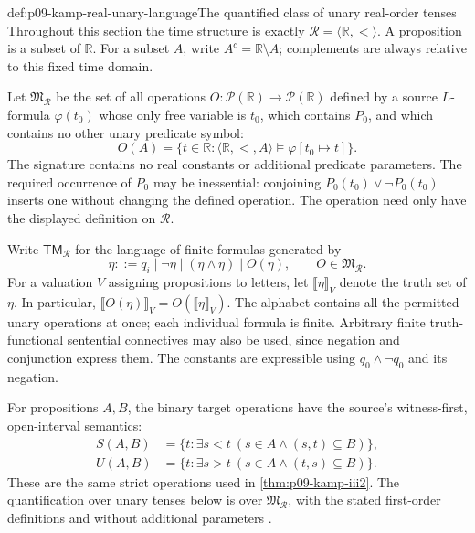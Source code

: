 \begin{hbdefinition}{def:p09-kamp-real-unary-language}{The quantified class of unary real-order tenses}
Throughout this section the time structure is exactly
\(\mathcal R=\langle\mathbb R,<\rangle\). A proposition is a subset
of \(\mathbb R\). For a subset \(A\), write
\(A^c=\mathbb R\setminus A\); complements are always relative to
this fixed time domain.

Let \(\mathfrak M_{\mathcal R}\) be the set of all operations
\(O:\mathcal P(\mathbb R)\to\mathcal P(\mathbb R)\) defined by
a source \(L\)-formula \(\varphi(t_0)\) whose only free variable
is \(t_0\), which contains \(P_0\), and which contains no
other unary predicate symbol:
\[
 O(A)=\{t\in\mathbb R:
       \langle\mathbb R,<,A\rangle\models\varphi[t_0\mapsto t]\}.
\]
The signature contains no real constants or additional predicate
parameters. The required occurrence of \(P_0\) may be
inessential: conjoining \(P_0(t_0)\lor\neg P_0(t_0)\)
inserts one without changing the defined operation. The operation
need only have the displayed definition on \(\mathcal R\).

Write \(\mathsf{TM}_{\mathcal R}\) for the language of finite
formulas generated by
\[
 \eta ::= q_i\mid\neg\eta\mid(\eta\land\eta)
                 \mid O(\eta),\qquad O\in\mathfrak M_{\mathcal R}.
\]
For a valuation \(V\) assigning propositions to letters, let
\(\llbracket\eta\rrbracket_V\) denote the truth set of \(\eta\).
In particular,
\(\llbracket O(\eta)\rrbracket_V
 =O(\llbracket\eta\rrbracket_V)\).
The alphabet contains all the permitted unary operations at once;
each individual formula is finite. Arbitrary finite truth-functional
sentential connectives may also be used, since negation and conjunction
express them. The constants are expressible using
\(q_0\land\neg q_0\) and its negation.

For propositions \(A,B\), the binary target operations have the
source's witness-first, open-interval semantics:
\[
\begin{aligned}
 S(A,B)&=\{t:\exists s<t\ (s\in A\land(s,t)\subseteq B)\},\\
 U(A,B)&=\{t:\exists s>t\ (s\in A\land(t,s)\subseteq B)\}.
\end{aligned}
\]
These are the same strict operations used in
\cref{thm:p09-kamp-iii2}. The quantification over unary tenses below
is over \(\mathfrak M_{\mathcal R}\), with the stated first-order
definitions and without additional parameters
\cite[ch.~II, defs.~2--3, pp.~21--22; ch.~IV, p.~95]{Kamp1968}.
\end{hbdefinition}


